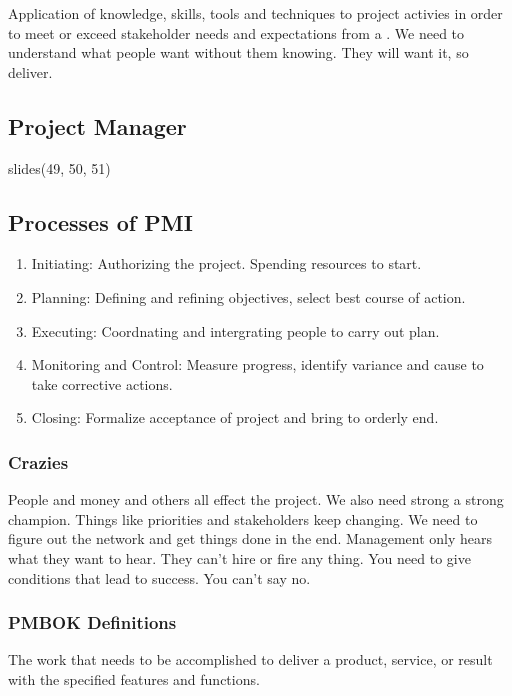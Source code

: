 \documentclass[english, 11pt]{article}
\begin{document}
      \begin{defn}\label{project management}
        Application of knowledge, skills, tools and techniques to project activies in order to meet or exceed stakeholder needs and expectations from a . We need to understand what people want without them knowing. They will want it, so deliver.
      \end{defn}

    \subsection{Project Manager}
      slides(49, 50, 51)

    \subsection{Processes of PMI}
      \begin{enumerate}
        \item Initiating: Authorizing the project. Spending resources to start.
        \item Planning: Defining and refining objectives, select best course of action.
        \item Executing: Coordnating and intergrating people to carry out plan.
        \item Monitoring and Control: Measure progress, identify variance and cause to take corrective actions.
        \item Closing: Formalize acceptance of project and bring to orderly end.
      \end{enumerate}

    \subsubsection*{Crazies}
      People and money and others all effect the project. We also need strong a strong champion. Things like priorities and stakeholders keep changing. We need to figure out the network and get things done in the end. Management only hears what they want to hear. They can't hire or fire any thing. You need to give conditions that lead to success. You can't say no.

    \subsubsection{PMBOK Definitions}\label{pmbok}

      \begin{defn}\label{scope}
        The work that needs to be accomplished to deliver a product, service, or result with the specified features and functions.
      \end{defn}
\end{document}
